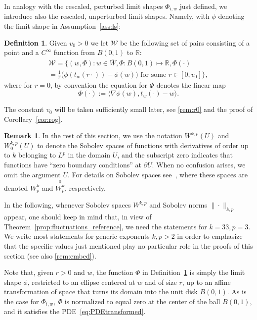 \documentclass[10pt]{amsart}
\theoremstyle{definition}\newtheorem{defi}[theo]{Definition}\newtheorem{rema}[theo]{Remark}\newtheorem{exam}[theo]{Example}\newtheorem{exem}[theo]{Example}\newtheorem{nota}[theo]{Notation}
\newcommand{\R}{\mathbb{R}}
\newcommand{\clW}{\mathcal{W}}
\begin{document}
In analogy with the rescaled, perturbed limit shapes $\Phi_{i,w}$ just defined, we introduce also the rescaled, unperturbed limit shapes. Namely, with $\phi$ denoting the limit shape in
Assumption~\ref{ass:ls}:
\begin{defi}\label{def:W}
Given $v_0>0$ we let $\clW$ be the following set of pairs consisting of a point and a $C^\infty$ function from $B(0,1)$ to $\R$:
\begin{multline}
\clW =
\Big\{(w, \Phi) : w \in \overline{W}, \Phi:B(0,1)\mapsto \R, \Phi(\cdot) \\= \frac{1}{r}\big(\phi(t_w(r\cdot)) - \phi(w)\big) \text{ for some } r\in [0,v_0]\Big\},
\end{multline}
where for $r = 0$, by convention the equation for $\Phi$ denotes the linear map
\begin{equation}\label{eq:linphi}
\Phi(\cdot):=\langle \nabla \phi(w), t_w (\cdot) - w \rangle.
\end{equation}
\end{defi}

The constant $v_0$ will be taken sufficiently small later, see
\cref{rem:r0} and the proof of Corollary~\ref{cor:rog}.

\begin{rema}
In the rest of this section, we use the notation $W^{k,p}(U)$ and $W^{k,p}_0(U)$ to denote the Sobolev spaces of functions with derivatives of order up to $k$ belonging to $L^p$ in the domain $U$, and the subscript zero indicates that functions have ``zero boundary conditions'' at $\partial U$. When no confusion arises, we omit the argument $U$. For details on Sobolev spaces see~\cite[Chapt.~8]{krilov}, where these spaces are denoted $W^k_p$ and ${\stackrel 0 {W^k_p}}$, respectively.

In the following, whenever Sobolev spaces $W^{k,p}$ and Sobolev norms $\|\cdot\|_{k,p}$ appear, one should keep in mind that, in view of Theorem~\ref{prop:fluctuations_reference}, we need the statements for $k=33, p=3$. We write most statements for generic exponents $k,p>2$ in order to emphasize that the specific values just mentioned play no particular role in the proofs of this section (see also
\cref{rem:embed}).
\end{rema}

Note that, given $r>0$ and $w$, the function $\Phi$ in Definition~\ref{def:W} is simply the limit shape $\phi$, restricted to an ellipse centered at $w$ and of size $r$, up to an affine transformation of space that turns its domain into the unit disk $B(0,1)$. As is the case for $\Phi_{i,w}$, $\Phi$ is normalized to equal zero at the center of the ball $B(0,1)$, and it satisfies the PDE~\eqref{eq:PDEtransformed}.
\end{document}
